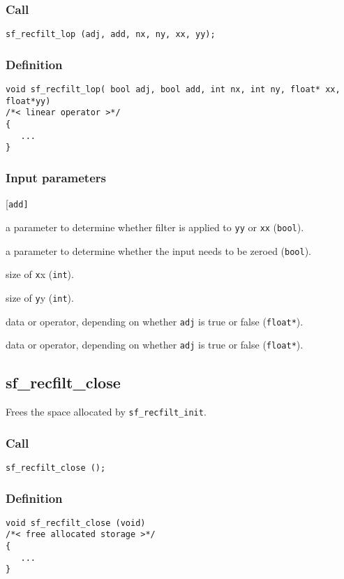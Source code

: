\subsubsection*{Call}
\begin{verbatim}sf_recfilt_lop (adj, add, nx, ny, xx, yy);\end{verbatim}

\subsubsection*{Definition}
\begin{verbatim}
void sf_recfilt_lop( bool adj, bool add, int nx, int ny, float* xx, float*yy) 
/*< linear operator >*/
{
   ...
}
\end{verbatim}

\subsubsection*{Input parameters}
\begin{desclist}{\tt }{\quad}[\tt add]
   \setlength\itemsep{0pt}
   \item[adj] a parameter to determine whether filter is applied to \texttt{yy} or \texttt{xx} (\texttt{bool}).
   \item[add] a parameter to determine whether the input needs to be zeroed (\texttt{bool}).
   \item[nx]  size of \texttt{x}x (\texttt{int}).
   \item[ny]  size of \texttt{y}y (\texttt{int}).
   \item[xx]  data or operator, depending on whether \texttt{adj} is true or false (\texttt{float*}).
   \item[yy]  data or operator, depending on whether \texttt{adj} is true or false (\texttt{float*}).
\end{desclist}




\subsection{{sf\_recfilt\_close}}
Frees the space allocated by \texttt{sf\_recfilt\_init}.

\subsubsection*{Call}
\begin{verbatim}sf_recfilt_close ();\end{verbatim}

\subsubsection*{Definition}
\begin{verbatim}
void sf_recfilt_close (void) 
/*< free allocated storage >*/
{
   ...
}
\end{verbatim}





